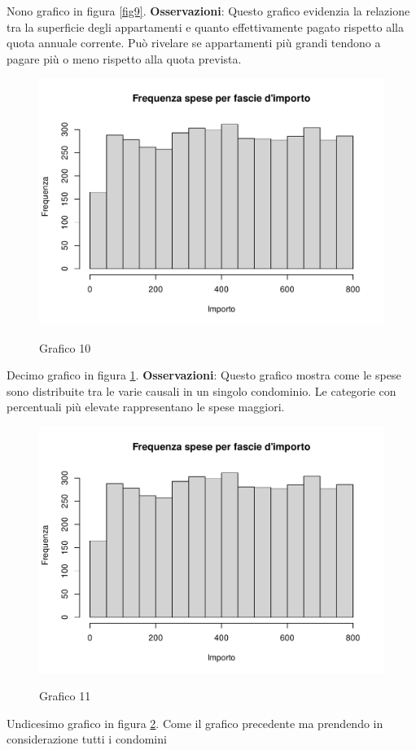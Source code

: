 Nono grafico in figura \ref{fig9}. \textbf{Osservazioni}: Questo grafico evidenzia la relazione tra la superficie degli appartamenti e quanto effettivamente pagato rispetto alla quota annuale corrente. Può rivelare se appartamenti più grandi tendono a pagare più o meno rispetto alla quota prevista.

\clearpage

\begin{figure}[t]
	\caption{Grafico 10}
	\includegraphics[page=10,width=\textwidth]{../R/grafici.pdf}
	\label{fig10}
\end{figure}

Decimo grafico in figura \ref{fig10}. \textbf{Osservazioni}: Questo grafico mostra come le spese sono distribuite tra le varie causali in un singolo condominio. Le categorie con percentuali più elevate rappresentano le spese maggiori.

\clearpage

\begin{figure}[t]
	\caption{Grafico 11}
	\includegraphics[page=11,width=\textwidth]{../R/grafici.pdf}
	\label{fig11}
\end{figure}

Undicesimo grafico in figura \ref{fig11}. Come il grafico precedente ma prendendo in considerazione tutti i condomini

